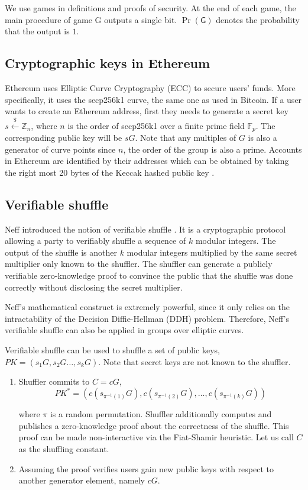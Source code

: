 \documentclass[conference, compsoc]{IEEEtran}
\theoremstyle{definition}
\begin{document}
We use games in definitions and proofs of security. At the end of each game, the main procedure of game \textsf{G} outputs a single bit. $\Pr(\textsf{G})$ denotes the probability that the output is $1$.
\subsection{Cryptographic keys in Ethereum}
Ethereum uses Elliptic Curve Cryptography (ECC) to secure users' funds. More specifically, it uses the secp256k1 curve, the same one as used in Bitcoin. If a user wants to create an Ethereum address, first they needs to generate a secret key  $s\stackrel{\$}{\leftarrow}\mathbb{Z}_n$, where $n$ is the order of secp256k1 over a finite prime field $\mathbb{F}_{p}$. The corresponding public key will be $sG$. Note that any multiples of $G$ is also a generator of curve points since $n$, the order of the group is also a prime. Accounts in Ethereum are identified by their addresses which can be obtained by taking the right most 20 bytes of the Keccak hashed public key \cite{wood2014ethereum}. 

\subsection{Verifiable shuffle}

Neff introduced the notion of verifiable shuffle \cite{neff2001verifiable}. It is a cryptographic protocol allowing a party to verifiably shuffle a sequence of $k$ modular integers. The output of the shuffle is another $k$ modular integers multiplied by the same secret multiplier only known to the shuffler. The shuffler can generate a publicly verifiable zero-knowledge proof to convince the public that the shuffle was done correctly without disclosing the secret multiplier. 

Neff's mathematical construct is extremely powerful, since it only relies on the intractability of the Decision Diffie-Hellman (DDH) problem. Therefore, Neff's verifiable shuffle can also be applied in groups over elliptic curves.

Verifiable shuffle can be used to shuffle a set of public keys, $PK=(s_{1}G,s_{2}G\dots,s_{k}G)$. Note that secret keys are not known to the shuffler.

\begin{enumerate}
	\item Shuffler commits to $C=cG$, 
		$$PK^*=(c(s_{\pi^{-1}(1)}G),c(s_{\pi^{-1}(2)}G),\dots,c({s_{\pi^{-1}(k)}}G))$$

	  where $\pi$ is a random permutation. Shuffler additionally computes and publishes a zero-knowledge proof about the correctness of the shuffle. This proof can be made non-interactive via the Fiat-Shamir heuristic. Let us call $C$ as the shuffling constant.
	\item Assuming the proof verifies users gain new public keys with respect to another generator element, namely $cG$.
\end{enumerate}
\end{document}

